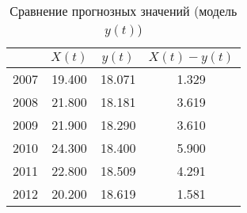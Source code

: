 \begin{table}[ht]
\centering
\begin{tabular}{r|ccc}
  \hline
 & $X(t)$ & $y(t)$ & $ X(t) - y(t) $ \\ 
  \hline
2007 & 19.400 & 18.071 & 1.329 \\ 
  2008 & 21.800 & 18.181 & 3.619 \\ 
  2009 & 21.900 & 18.290 & 3.610 \\ 
  2010 & 24.300 & 18.400 & 5.900 \\ 
  2011 & 22.800 & 18.509 & 4.291 \\ 
  2012 & 20.200 & 18.619 & 1.581 \\ 
   \hline
\end{tabular}
\caption{Сравнение прогнозных значений (модель $ y(t) $)} 
\label{table:prediction_trend}
\end{table}
